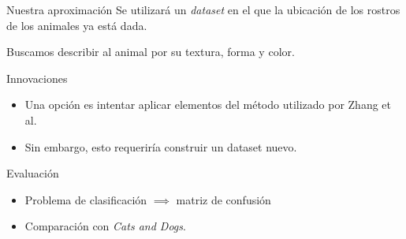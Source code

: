 \documentclass{beamer}
\begin{document}
	\begin{frame}{Nuestra aproximación}
        Se utilizará un \emph{dataset} en el que la ubicación de los rostros de
        los animales ya está dada.

		Buscamos describir al animal por su textura, forma y color.
	\end{frame}
	\begin{frame}{Innovaciones}
        \begin{itemize}
            \item Una opción es intentar aplicar elementos del método utilizado
                por Zhang et al.
            \item Sin embargo, esto requeriría construir un dataset nuevo.
        \end{itemize}
	\end{frame}
	\begin{frame}{Evaluación}
        \begin{itemize}
            \item Problema de clasificación $\implies$ matriz de confusión
            \item Comparación con \emph{Cats and Dogs}.
        \end{itemize}
	\end{frame}
\end{document}
